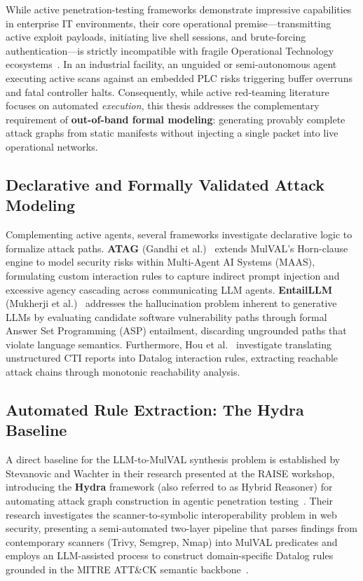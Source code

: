 \documentclass[target=mst,aauheader=aics,style=]{thud}
\begin{document}
While active penetration-testing frameworks demonstrate impressive capabilities in enterprise IT environments, their core operational premise---transmitting active exploit payloads, initiating live shell sessions, and brute-forcing authentication---is strictly incompatible with fragile Operational Technology ecosystems~\cite{SunderOT, TayouriSurvey}. In an industrial facility, an unguided or semi-autonomous agent executing active scans against an embedded PLC risks triggering buffer overruns and fatal controller halts. Consequently, while active red-teaming literature focuses on automated \textit{execution}, this thesis addresses the complementary requirement of \textbf{out-of-band formal modeling}: generating provably complete attack graphs from static manifests without injecting a single packet into live operational networks.

\subsection{Declarative and Formally Validated Attack Modeling}
\label{sec:declarative_formal_modeling}
Complementing active agents, several frameworks investigate declarative logic to formalize attack paths. \textbf{ATAG} (Gandhi et al.)~\cite{GandhiATAG} extends MulVAL's Horn-clause engine to model security risks within Multi-Agent AI Systems (MAAS), formulating custom interaction rules to capture indirect prompt injection and excessive agency cascading across communicating LLM agents. \textbf{EntailLLM} (Mukherji et al.)~\cite{MukherjiEntailLLM} addresses the hallucination problem inherent to generative LLMs by evaluating candidate software vulnerability paths through formal Answer Set Programming (ASP) entailment, discarding ungrounded paths that violate language semantics. Furthermore, Hou et al.~\cite{HouCTI} investigate translating unstructured CTI reports into Datalog interaction rules, extracting reachable attack chains through monotonic reachability analysis.

\subsection{Automated Rule Extraction: The Hydra Baseline}
\label{sec:raise_comparison}
A direct baseline for the LLM-to-MulVAL synthesis problem is established by Stevanovic and Wachter in their research presented at the RAISE workshop, introducing the \textbf{Hydra} framework (also referred to as Hybrid Reasoner) for automating attack graph construction in agentic penetration testing~\cite{StevanovicWachterRAISE}. Their research investigates the scanner-to-symbolic interoperability problem in web security, presenting a semi-automated two-layer pipeline that parses findings from contemporary scanners (Trivy, Semgrep, Nmap) into MulVAL predicates and employs an LLM-assisted process to construct domain-specific Datalog rules grounded in the MITRE ATT\&CK semantic backbone~\cite{mitre_ics}.
\end{document}
